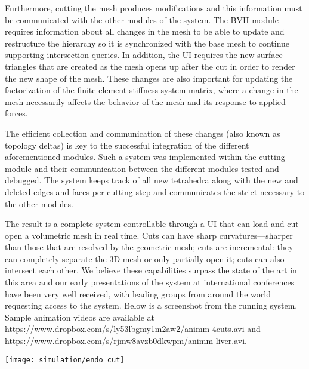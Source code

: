 Furthermore, cutting the mesh produces modifications and this information must be communicated with the other modules of the system. The BVH module requires information about all changes in the mesh to be able to update and restructure the hierarchy so it is synchronized with the base mesh to continue supporting intersection queries. In addition, the UI requires the new surface triangles that are created as the mesh opens up after the cut in order to render the new shape of the mesh. These changes are also important for updating the factorization of the finite element stiffness system matrix, where a change in the mesh necessarily affects the behavior of the mesh and its response to applied forces.

The efficient collection and communication of these changes (also known as topology deltas) is key to the successful integration of the different aforementioned modules. Such a system was implemented within the cutting module and their communication between the different modules tested and debugged. The system keeps track of all new tetrahedra along with the new and deleted edges and faces per cutting step and communicates the strict necessary to the other modules.

The result is a complete system controllable through a UI that can load and cut open a volumetric mesh in real time. Cuts can have sharp curvatures---sharper than those that are resolved by the geometric mesh; cuts are incremental: they can completely separate the 3D mesh or only partially open it; cuts can also intersect each other. We believe these capabilities surpass the state of the art in this area and our early presentations of the system at international conferences have been very well received, with leading groups from around the world requesting access to the system. Below is a screenshot from the running system. Sample animation videos are available at \url{https://www.dropbox.com/s/ly53lbgmy1m2aw2/animm-4cuts.avi} and \url{https://www.dropbox.com/s/rjmw8avzb0dkwpm/animm-liver.avi}.

\vspace{1ex}
\texttt{[image: simulation/endo\_cut]}

